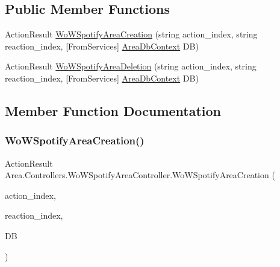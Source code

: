 \subsection*{Public Member Functions}
\begin{DoxyCompactItemize}
\item 
Action\+Result \mbox{\hyperlink{classArea_1_1Controllers_1_1WoWSpotifyAreaController_a86442bf27b5e33c6a646553aab5c8745}{Wo\+W\+Spotify\+Area\+Creation}} (string action\+\_\+index, string reaction\+\_\+index, \mbox{[}From\+Services\mbox{]} \mbox{\hyperlink{classArea_1_1DAT_1_1AreaDbContext}{Area\+Db\+Context}} DB)
\item 
Action\+Result \mbox{\hyperlink{classArea_1_1Controllers_1_1WoWSpotifyAreaController_aa0983209b4870cecb8bd9e2d6c4c34f0}{Wo\+W\+Spotify\+Area\+Deletion}} (string action\+\_\+index, string reaction\+\_\+index, \mbox{[}From\+Services\mbox{]} \mbox{\hyperlink{classArea_1_1DAT_1_1AreaDbContext}{Area\+Db\+Context}} DB)
\end{DoxyCompactItemize}


\subsection{Member Function Documentation}
\mbox{\label{classArea_1_1Controllers_1_1WoWSpotifyAreaController_a86442bf27b5e33c6a646553aab5c8745}} 
\subsubsection{\texorpdfstring{Wo\+W\+Spotify\+Area\+Creation()}{WoWSpotifyAreaCreation()}}
{\footnotesize\ttfamily Action\+Result Area.\+Controllers.\+Wo\+W\+Spotify\+Area\+Controller.\+Wo\+W\+Spotify\+Area\+Creation (\begin{DoxyParamCaption}\item[{string}]{action\+\_\+index,  }\item[{string}]{reaction\+\_\+index,  }\item[{\mbox{[}\+From\+Services\mbox{]} \mbox{\hyperlink{classArea_1_1DAT_1_1AreaDbContext}{Area\+Db\+Context}}}]{DB }\end{DoxyParamCaption})\hspace{0.3cm}{\ttfamily [inline]}}


